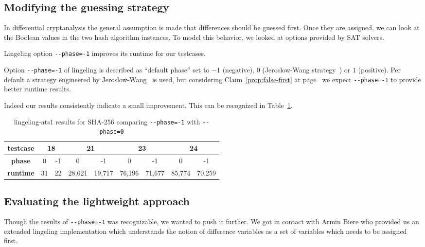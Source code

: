 \subsection{Modifying the guessing strategy}
\label{sec:results-guessing}
%
In differential cryptanalysis the general assumption is made that
differences should be guessed first. Once they are assigned, we
can look at the Boolean values in the two hash algorithm instances.
To model this behavior, we looked at options provided by SAT solvers.

\newcommand\mone[1][-1]{\texttt{-{}-phase=#1}}
\begin{prop}
  Lingeling option \mone{} improves its runtime for our testcases.
\end{prop}
%
Option \mone{} of lingeling is described as \enquote{default phase} set to
$-1$ (negative), $0$ (Jeroslow-Wang strategy~\cite{JeroslowWang})
or $1$ (positive). Per default a strategy engineered by
Jeroslow-Wang~\cite{JeroslowWang} is used, but considering
Claim~\ref{prop:false-first} at page~\pageref{prop:false-first}
we expect \mone{} to provide better runtime results.

Indeed our results consistently indicate a small improvement.
This can be recognized in Table~\ref{tab:phase-results}.

\begin{table}[!h]
  \begin{center}
    \begin{tabular}{c|cc cc cc cc}
      \textbf{testcase} & \multicolumn{2}{c}{18} & \multicolumn{2}{c}{21} & \multicolumn{2}{c}{23} & \multicolumn{2}{c}{24} \\
    \hline
      \textbf{phase}    &       0 &     -1 &       0 &     -1 &       0 &     -1 &       0 &     -1 \\
    \hline
      \textbf{runtime}  &      31 &     22 &  28,621 & 19,717 &  76,196 & 71,677 & 85,774  & 70,259 \\
    \end{tabular}
    \caption{lingeling-ats1 results for SHA-256 comparing \mone{} with \mone[0]{}}
    \label{tab:phase-results}
  \end{center}
\end{table}

\subsection{Evaluating the lightweight approach}
\label{sec:lightweight-results}
%
Though the results of \mone{} was recognizable, we wanted to push it further.
We got in contact with Armin Biere who provided us an extended lingeling implementation
which understands the notion of difference variables as a set of variables which needs
to be assigned first.

